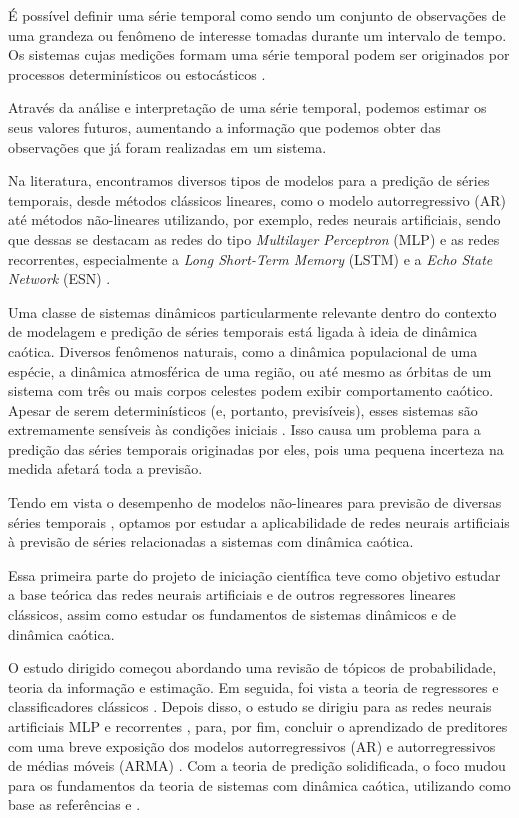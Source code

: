 \documentclass[a4paper, 12pt]{article}
\begin{document}
É possível definir uma série temporal como sendo um conjunto de observações de uma grandeza ou fenômeno de interesse tomadas durante um intervalo de tempo. Os sistemas cujas medições formam uma série temporal podem ser originados por processos determinísticos ou estocásticos \cite{box2015time}.

Através da análise e interpretação de uma série temporal, podemos estimar os seus valores futuros, aumentando a informação que podemos obter das observações que já foram realizadas em um sistema.

Na literatura, encontramos diversos tipos de modelos para a  predição de séries temporais, desde métodos clássicos lineares, como o modelo autorregressivo (AR) \cite{box2015time} até métodos não-lineares utilizando, por exemplo, redes neurais artificiais, sendo que dessas se destacam as redes do tipo \textit{Multilayer Perceptron} (MLP) e as redes recorrentes, especialmente a \textit{Long Short-Term Memory} (LSTM)  \cite{connor1994recurrent} e a \textit{Echo State Network} (ESN) \cite{jaeger2007echo}.

Uma classe de sistemas dinâmicos particularmente relevante dentro do contexto de modelagem e predição de séries temporais está ligada à ideia de dinâmica caótica. Diversos fenômenos naturais, como a dinâmica populacional de uma espécie, a dinâmica atmosférica de uma região, ou até mesmo as órbitas de um sistema com três ou mais corpos celestes podem exibir comportamento caótico. Apesar de serem determinísticos (e, portanto, previsíveis), esses sistemas são extremamente sensíveis às condições iniciais \cite{fiedler1994caos}. Isso causa um problema para a predição das séries temporais originadas por eles, pois uma pequena incerteza na medida afetará toda a previsão. 

Tendo em vista o desempenho de modelos não-lineares para previsão de diversas séries temporais \cite{connor1994recurrent}, optamos por estudar a aplicabilidade de redes neurais artificiais à previsão de séries relacionadas a sistemas com dinâmica caótica.

Essa primeira parte do projeto de iniciação científica teve como objetivo estudar a base teórica das redes neurais artificiais e de outros regressores lineares clássicos, assim como estudar os fundamentos de sistemas dinâmicos e de dinâmica caótica. 

O estudo dirigido começou abordando uma revisão de tópicos de probabilidade, teoria da informação e estimação. Em seguida, foi vista a teoria de regressores e classificadores clássicos \cite{hastie2009elements}. Depois disso, o estudo se dirigiu para as redes neurais artificiais MLP e recorrentes \cite{geron2019hands}, para, por fim, concluir o aprendizado de preditores com uma breve exposição dos modelos autorregressivos (AR) e autorregressivos de médias móveis (ARMA) \cite{box2015time}. Com a teoria de predição solidificada, o foco mudou para os fundamentos da teoria de sistemas com dinâmica caótica, utilizando como base as referências \cite{fiedler1994caos} e \cite{attux2001dinamica}.
\end{document}

